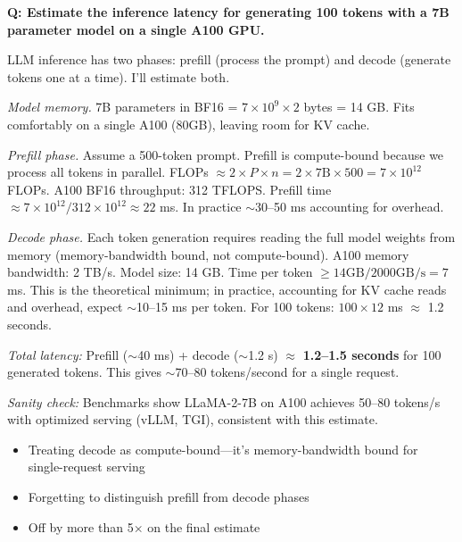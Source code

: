 \begin{interviewq}
\textbf{Q: Estimate the inference latency for generating 100 tokens with a 7B parameter model on a single A100 GPU.}

 \quad {} \quad \badgefreq{\freqmed}

\stronganswer LLM inference has two phases: prefill (process the prompt) and decode (generate tokens one at a time). I'll estimate both.

\textit{Model memory.} 7B parameters in BF16 = $7 \times 10^9 \times 2$ bytes = 14 GB. Fits comfortably on a single A100 (80GB), leaving room for KV cache.

\textit{Prefill phase.} Assume a 500-token prompt. Prefill is compute-bound because we process all tokens in parallel. FLOPs $\approx 2 \times P \times n = 2 \times 7\text{B} \times 500 = 7 \times 10^{12}$ FLOPs. A100 BF16 throughput: 312 TFLOPS. Prefill time $\approx 7 \times 10^{12} / 312 \times 10^{12} \approx 22$ ms. In practice $\sim$30--50 ms accounting for overhead.

\textit{Decode phase.} Each token generation requires reading the full model weights from memory (memory-bandwidth bound, not compute-bound). A100 memory bandwidth: 2 TB/s. Model size: 14 GB. Time per token $\geq 14 \text{GB} / 2000 \text{GB/s} = 7$ ms. This is the theoretical minimum; in practice, accounting for KV cache reads and overhead, expect $\sim$10--15 ms per token. For 100 tokens: $100 \times 12$ ms $\approx$ 1.2 seconds.

\textit{Total latency:} Prefill ($\sim$40 ms) + decode ($\sim$1.2 s) $\approx$ \textbf{1.2--1.5 seconds} for 100 generated tokens. This gives $\sim$70--80 tokens/second for a single request.

\textit{Sanity check:} Benchmarks show LLaMA-2-7B on A100 achieves 50--80 tokens/s with optimized serving (vLLM, TGI), consistent with this estimate.

\redflags
\begin{itemize}
    \item Treating decode as compute-bound---it's memory-bandwidth bound for single-request serving
    \item Forgetting to distinguish prefill from decode phases
    \item Off by more than 5$\times$ on the final estimate
\end{itemize}



\end{interviewq}
